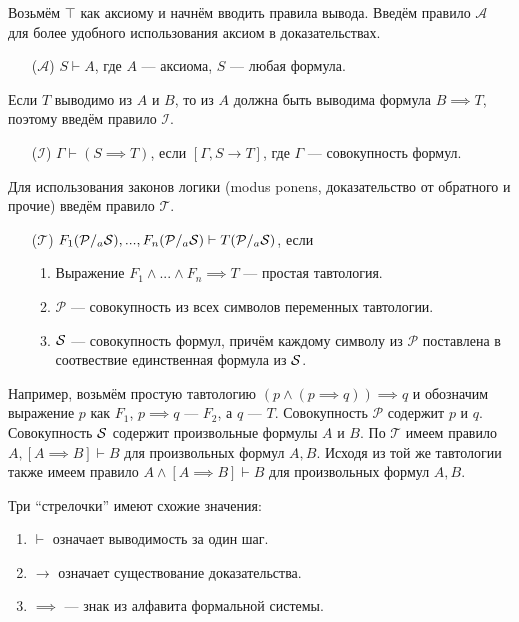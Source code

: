 \newcommand\taut{$\mathcal T$}
\newcommand\axiom{$\mathcal A$}
\newcommand\conj{$\mathcal C$}
\newcommand\implic{$\mathcal I$}
\newcommand\Px{\mathcal P}
Возьмём $\top$ как аксиому и начнём вводить правила вывода.
Введём правило \axiom{} для более удобного использования аксиом в доказательствах.
\begin{enumerate}
	\item[(\axiom)]{}$S\vdash A$, где $A$ --- аксиома, $S$ --- любая формула.
\end{enumerate}

Если $T$ выводимо из $A$ и $B$, то из $A$ должна быть выводима формула $B\implies T$,
поэтому введём правило \implic{}.
\begin{enumerate}
	\item[(\implic)]{}${\Gamma\vdash (S\implies T)}$, если $[\Gamma,S\to T]$,
	где $\Gamma$ --- совокупность формул.
\end{enumerate}

\pagebreak
Для использования законов логики (modus ponens, доказательство от обратного и прочие)
введём правило \taut{}.
\begin{enumerate}
	\item[(\taut)]{}$F_1(\Px/_{a}\Sx),...,F_n(\Px/_{a}\Sx)\vdash T(\Px/_{a}\Sx)$,
	если
	\begin{enumerate}
		\item{}Выражение ${F_1\land...\land F_n\implies T}$ --- простая тавтология.
		\item{}$\Px$ --- совокупность из всех символов переменных тавтологии.
		\item{}$\mathcal S$ --- совокупность формул, причём каждому символу из $\Px$
		поставлена в соотвествие единственная формула из $\mathcal S$.
	\end{enumerate}

\end{enumerate}

Например, возьмём простую тавтологию $(p\land (p\implies q))\implies q$
и обозначим выражение $p$ как $F_1$, $p\implies q$ --- $F_2$,
а $q$ --- $T$.
Совокупность $\Px$ содержит $p$ и $q$.
Совокупность $\mathcal S$ содержит произвольные формулы $A$ и $B$.
По \taut{} имеем правило $A,[A\implies B]\vdash B$
для произвольных формул $A,B$.
Исходя из той же тавтологии также имеем правило
$A\land[A\implies B]\vdash B$
для произвольных формул $A,B$.

Три ``стрелочки'' имеют схожие значения:
\begin{enumerate}
	\item{}$\vdash$ означает выводимость за один шаг.
	\item{}$\to$ означает существование доказательства.
	\item{}$\implies$ --- знак из алфавита формальной системы.
\end{enumerate}

